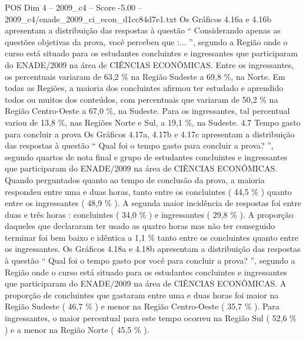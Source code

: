 \begin{textsample}{POS Dim 4 – 2009\_c4 – Score -5.00 – 2009\_c4/enade\_2009\_ci\_econ\_d1cc84d7e1.txt}
Os Gráficos 4.16a e 4.16b apresentam a distribuição das respostas à questão “ Considerando apenas as questões objetivas da prova, você percebeu que :... ”, segundo a Região onde o curso está situado para os estudantes concluintes e ingressantes que participaram do ENADE/2009 na área de CIÊNCIAS ECONÔMICAS.
Entre os ingressantes, os percentuais variaram de 63,2 \% na Região Sudeste a 69,8 \%, na Norte.
Em todas as Regiões, a maioria dos concluintes afirmou ter estudado e aprendido todos ou muitos dos conteúdos, com percentuais que variaram de 50,2 \% na Região Centro-Oeste a 67,0 \%, na Sudeste.
Para os ingressantes, tal percentual variou de 13,8 \%, nas Regiões Norte e Sul, a 19,1 \%, na Sudeste. 4.7 Tempo gasto para concluir a prova Os Gráficos 4.17a, 4.17b e 4.17c apresentam a distribuição das respostas à questão “ Qual foi o tempo gasto para concluir a prova? ”, segundo quartos de nota final e grupo de estudantes concluintes e ingressantes que participaram do ENADE/2009 na área de CIÊNCIAS ECONÔMICAS.
Quando perguntados quanto ao tempo de conclusão da prova, a maioria respondeu entre uma e duas horas, tanto entre os concluintes ( 44,5 \% ) quanto entre os ingressantes ( 48,9 \% ).
A segunda maior incidência de respostas foi entre duas e três horas : concluintes ( 34,0 \% ) e ingressantes ( 29,8 \% ).
A proporção daqueles que declararam ter usado as quatro horas mas não ter conseguido terminar foi bem baixo e idêntica a 1,1 \% tanto entre os concluintes quanto entre os ingressantes.
Os Gráficos 4.18a e 4.18b apresentam a distribuição das respostas à questão “ Qual foi o tempo gasto por você para concluir a prova? ”, segundo a Região onde o curso está situado para os estudantes concluintes e ingressantes que participaram do ENADE/2009 na área de CIÊNCIAS ECONÔMICAS.
A proporção de concluintes que gastaram entre uma e duas horas foi maior na Região Sudeste ( 46,7 \% ) e menor na Região Centro-Oeste ( 35,7 \% ).
Para ingressantes, o maior percentual para este tempo ocorreu na Região Sul ( 52,6 \% ) e a menor na Região Norte ( 45,5 \% ).

\end{textsample}
